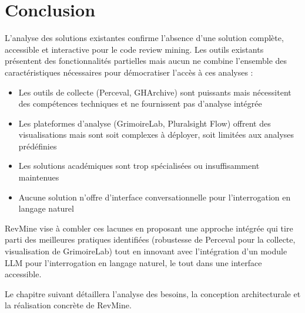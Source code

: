 \section{Conclusion}

L'analyse des solutions existantes confirme l'absence d'une solution complète, accessible et interactive pour le code review mining. Les outils existants présentent des fonctionnalités partielles mais aucun ne combine l'ensemble des caractéristiques nécessaires pour démocratiser l'accès à ces analyses :

\begin{itemize}
    \item Les outils de collecte (Perceval, GHArchive) sont puissants mais nécessitent des compétences techniques et ne fournissent pas d'analyse intégrée
    \item Les plateformes d'analyse (GrimoireLab, Pluralsight Flow) offrent des visualisations mais sont soit complexes à déployer, soit limitées aux analyses prédéfinies
    \item Les solutions académiques sont trop spécialisées ou insuffisamment maintenues
    \item Aucune solution n'offre d'interface conversationnelle pour l'interrogation en langage naturel
\end{itemize}

RevMine vise à combler ces lacunes en proposant une approche intégrée qui tire parti des meilleures pratiques identifiées (robustesse de Perceval pour la collecte, visualisation de GrimoireLab) tout en innovant avec l'intégration d'un module LLM pour l'interrogation en langage naturel, le tout dans une interface accessible.

Le chapitre suivant détaillera l'analyse des besoins, la conception architecturale et la réalisation concrète de RevMine.